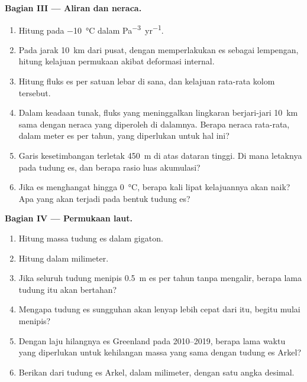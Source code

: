 \begin{problem}
\medskip\noindent\textbf{Bagian III --- Aliran dan neraca.}
\begin{enumerate}[resume]
\item Hitung  pada \qty{-10}{\celsius} dalam
  \unit{Pa^{-3}.yr^{-1}}.
\item Pada jarak \qty{10}{km} dari pusat, dengan memperlakukan es sebagai lempengan,
  hitung kelajuan permukaan akibat deformasi internal.
\item Hitung fluks es per satuan lebar di sana, dan kelajuan rata-rata
  kolom tersebut.
\item Dalam keadaan tunak, fluks yang meninggalkan lingkaran berjari-jari
  \qty{10}{km} sama dengan neraca yang diperoleh di dalamnya. Berapa neraca rata-rata, dalam
  meter es per tahun, yang diperlukan untuk hal ini?
\item Garis kesetimbangan terletak \qty{450}{m} di atas dataran tinggi. Di mana letaknya
  pada tudung es, dan berapa rasio luas akumulasi?
\item Jika es menghangat hingga \qty{0}{\celsius}, berapa kali lipat
  kelajuannya akan naik? Apa yang akan terjadi pada bentuk tudung es?
\end{enumerate}

\medskip\noindent\textbf{Bagian IV --- Permukaan laut.}
\begin{enumerate}[resume]
\item Hitung massa tudung es dalam gigaton.
\item Hitung  dalam milimeter.
\item Jika seluruh tudung menipis \qty{0.5}{m} es per tahun tanpa mengalir,
  berapa lama tudung itu akan bertahan?
\item Mengapa tudung es sungguhan akan lenyap lebih cepat dari itu, begitu
  mulai menipis?
\item Dengan laju hilangnya es Greenland pada 2010--2019, berapa lama
  waktu yang diperlukan untuk kehilangan massa yang sama dengan tudung es Arkel?
\item Berikan  dari tudung es Arkel, dalam milimeter,
  dengan satu angka desimal.
\end{enumerate}
\end{problem}
